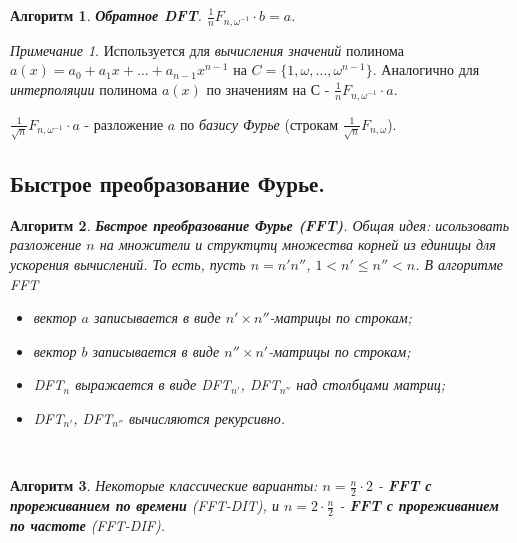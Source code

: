 \documentclass[a4paper]{article}
\theoremstyle{indented}
\newtheorem{alg}{Алгоритм}
\theoremstyle{definition}
\theoremstyle{remark}
\newtheorem{remark}{Примечание}
\begin{document}
\begin{alg}
    \textbf{Обратное DFT}. $\frac{1}{n}F_{n, \omega^{-1}}\cdot b = a$.
\end{alg}

\begin{remark}
    Используется для \textit{вычисления значений} полинома $a(x)=a_0+a_1x+\ldots+a_{n-1}x^{n-1}$ на $C=\{1, \omega, \ldots, \omega^{n-1}\}$. Аналогично для \textit{интерполяции} полинома $a(x)$ по значениям на $С$ - $\frac{1}{n}F_{n, \omega^{-1}}\cdot a$. \ 

    $\frac{1}{\sqrt{n}}F_{n, \omega^{-1}}\cdot a$ - разложение $a$ по \textit{базису Фурье} (строкам $\frac{1}{\sqrt{n}}F_{n, \omega}$). 
\end{remark}

\subsection{Быстрое преобразование Фурье.}

\begin{alg}
    \textbf{Бвстрое преобразование Фурье (FFT)}. Общая идея: исользовать разложение $n$ на множители и структцтц множества корней из единицы для ускорения вычислений. То есть, пусть $n=n'n''$, $1<n'\leq n'' < n$. В алгоритме FFT 

    \begin{itemize}
        \item вектор $a$ записывается в виде $n'\times n''$-матрицы по строкам; 
        \item вектор $b$ записывается в виде $n''\times n'$-матрицы по строкам; 
        \item DFT$_n$ выражается в виде DFT$_{n'}$, DFT$_{n''}$ над столбцами матриц; 
        \item DFT$_{n'}$, DFT$_{n''}$ вычисляются рекурсивно. 
    \end{itemize}
\end{alg} \

\begin{alg}
    Некоторые классические варианты: $n=\frac{n}{2}\cdot 2$ - \textbf{FFT с прореживанием по времени} (FFT-DIT), и $n=2\cdot \frac{n}{2}$ - \textbf{FFT с прореживанием по частоте} (FFT-DIF). 
\end{alg} \ 
\end{document}
